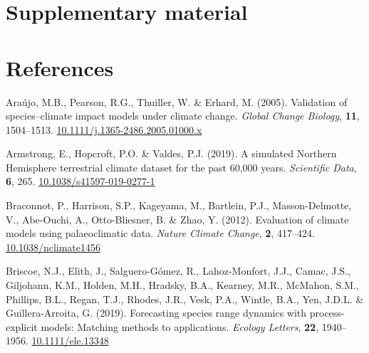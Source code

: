 \documentclass[11pt,]{article}
\newlength{\cslhangindent}
\newenvironment{CSLReferences}[2] %
 {%
  \setlength{\parindent}{0pt}
  \ifodd #1 \everypar{\setlength{\hangindent}{\cslhangindent}}\ignorespaces\fi
  \ifnum #2 > 0
  \setlength{\parskip}{#2\baselineskip}
  \fi
 }%
 {}
\begin{document}
\hypertarget{supplementary-material}{%
\section{Supplementary material}\label{supplementary-material}}

\hypertarget{references}{%
\section{References}\label{references}}

\setlength{\parindent}{-0.2in}
\setlength{\leftskip}{0.2in}
\setlength{\parskip}{8pt}
\vspace*{-0.2in}

\noindent

\hypertarget{refs}{}
\begin{CSLReferences}{1}{0}
\leavevmode{}%
Araújo, M.B., Pearson, R.G., Thuiller, W. \& Erhard, M. (2005).
Validation of species--climate impact models under climate change.
\emph{Global Change Biology}, \textbf{11}, 1504--1513.
\href{https://doi.org/10.1111/j.1365-2486.2005.01000.x}{10.1111/j.1365-2486.2005.01000.x}

\leavevmode{}%
Armstrong, E., Hopcroft, P.O. \& Valdes, P.J. (2019). A simulated
{Northern} {Hemisphere} terrestrial climate dataset for the past 60,000
years. \emph{Scientific Data}, \textbf{6}, 265.
\href{https://doi.org/10.1038/s41597-019-0277-1}{10.1038/s41597-019-0277-1}

\leavevmode{}%
Braconnot, P., Harrison, S.P., Kageyama, M., Bartlein, P.J.,
Masson-Delmotte, V., Abe-Ouchi, A., Otto-Bliesner, B. \& Zhao, Y.
(2012). Evaluation of climate models using palaeoclimatic data.
\emph{Nature Climate Change}, \textbf{2}, 417--424.
\href{https://doi.org/10.1038/nclimate1456}{10.1038/nclimate1456}

\leavevmode{}%
Briscoe, N.J., Elith, J., Salguero-Gómez, R., Lahoz-Monfort, J.J.,
Camac, J.S., Giljohann, K.M., Holden, M.H., Hradsky, B.A., Kearney,
M.R., McMahon, S.M., Phillips, B.L., Regan, T.J., Rhodes, J.R., Vesk,
P.A., Wintle, B.A., Yen, J.D.L. \& Guillera-Arroita, G. (2019).
Forecasting species range dynamics with process-explicit models:
Matching methods to applications. \emph{Ecology Letters}, \textbf{22},
1940--1956. \href{https://doi.org/10.1111/ele.13348}{10.1111/ele.13348}


\end{CSLReferences}
\end{document}
